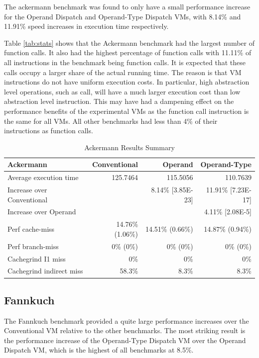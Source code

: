 \documentclass[english,a4paper,12pt]{report}
\begin{document}
The ackermann benchmark was found to only have a small performance
increase for the Operand Dispatch and Operand-Type Dispatch VMs, with
8.14\% and 11.91\% speed increases in execution time respectively.

Table \ref{tab:stats} shows that the Ackermann benchmark had the
largest number of function calls. It also had the highest percentage
of function calls with 11.11\% of all instructions in the benchmark
being function calls. It is expected that these calls occupy a larger
share of the actual running time. The reason is that VM instructions
do not have uniform execution costs. In particular, high abstraction
level operations, such as call, will have a much larger execution cost
than low abstraction level instruction. This may have had a dampening
effect on the performance benefits of the experimental VMs as the
function call instruction is the same for all VMs. All other
benchmarks had less than 4\% of their instructions as function calls.

\begin{table}[!htb]
  \begin{center}
    \begin{tabular}{lrrr}
      Ackermann & Conventional & Operand & Operand-Type\\
      \hline
      Average execution time & 125.7464 & 115.5056 & 110.7639\\
      Increase over Conventional &  & 8.14\% [3.85E-23] & 11.91\% [7.23E-17]\\
      Increase over Operand &  &  & 4.11\% [2.08E-5]\\
      Perf cache-miss & 14.76\% (1.06\%) & 14.51\% (0.66\%) & 14.87\% (0.94\%)\\
      Perf branch-miss & 0\% (0\%) & 0\% (0\%) & 0\% (0\%)\\
      Cachegrind I1 miss & 0\% & 0\% & 0\%\\
      Cachegrind indirect miss & 58.3\% & 8.3\% & 8.3\%\\
    \end{tabular}
  \end{center}
  \caption{Ackermann Results Summary}
\end{table}


\subsection{Fannkuch}

The Fannkuch benchmark provided a quite large performance increases
over the Conventional VM relative to the other benchmarks. The most
striking result is the performance increase of the Operand-Type
Dispatch VM over the Operand Dispatch VM, which is the highest of all
benchmarks at 8.5\%.
\end{document}
